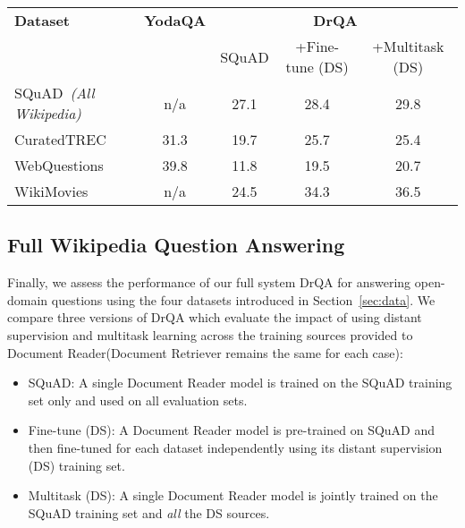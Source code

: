 \documentclass[11pt,a4paper]{article}
\newcommand\squad{SQuAD\xspace}
\newcommand\lcurq{CuratedTREC\xspace}
\newcommand\wikim{WikiMovies\xspace}
\newcommand\wq{WebQuestions\xspace}
\newcommand\us{DrQA\xspace}
\newcommand\usr{Document Retriever\xspace}
\newcommand\usp{Document Reader\xspace}
\begin{document}
\begin{table*}[ht]
\begin{center}
\begin{tabular}{l|c|ccc}
\hline
\bf Dataset &  \bf YodaQA &  \multicolumn{3}{c}{\bf \us} \\
&   &  SQuAD &  +Fine-tune (DS) & +Multitask (DS) \\
\hline
\squad~{\small\it(All Wikipedia)}&  n/a & 27.1 & 28.4 & 29.8\\
\lcurq & 31.3 & 19.7 & 25.7 & 25.4   \\
\wq & 39.8 & 11.8 & 19.5 & 20.7  \\
\wikim & n/a & 24.5 & 34.3 & 36.5  \\
\hline
\end{tabular}
\end{center}
\caption{\label{tab:full-pip-res} Full Wikipedia results. Top-1 exact-match accuracy (in \%, using SQuAD eval script). +Fine-tune (DS): \usp models trained on SQuAD and fine-tuned on each DS training set independently. +Multitask (DS): \usp single model trained on SQuAD and all the distant supervision (DS) training sets jointly. YodaQA results are extracted from {\small \url{https://github.com/brmson/yodaqa/wiki/Benchmarks}} and use additional resources such as Freebase and
DBpedia, see Section \ref{sec:rwork}.}
\end{table*}

\subsection{Full Wikipedia Question Answering}

Finally, we assess the performance of our full system \us for answering open-domain questions using the four datasets introduced in Section~\ref{sec:data}.
We compare three versions of \us which evaluate the impact of using distant supervision and multitask learning across the training sources provided to \usp (\usr remains the same for each case):
\begin{itemize}
\item SQuAD:
A single \usp model is trained on the SQuAD training set only and used on all evaluation sets.
\vspace{-1mm}
\item
Fine-tune (DS): A \usp model is pre-trained on SQuAD and then fine-tuned for each dataset independently using its distant supervision (DS) training set.
\vspace{-1mm}
\item
Multitask (DS): A single \usp model is jointly trained on the SQuAD training set and {\em all} the DS sources.
\end{itemize}
\end{document}
